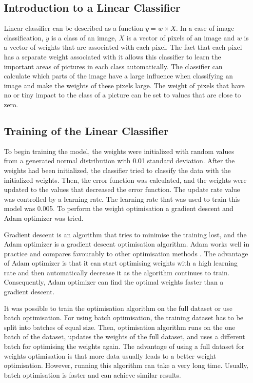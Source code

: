 \subsection{Introduction to a Linear Classifier}
 Linear classifier can be described as a function \(y = w\times X\). In a case of image classification, \(y\) is a class of an image, \(X\) is a vector of pixels of an image and  \(w\) is a vector of weights that are associated with each pixel. The fact that each pixel has a separate weight associated with it allows this classifier to learn the important areas of pictures in each class automatically. The classifier can calculate which parts of the image have a large influence when classifying an image and make the weights of these pixels large. The weight of pixels that have no or tiny impact to the class of a picture can be set to values that are close to zero.

\subsection{Training  of  the Linear Classifier}
To begin training the model, the weights were initialized with random values from a generated normal distribution with 0.01 standard deviation. After the weights had been initialized, the classifier tried to classify the data with the initialized weights. Then, the error function was calculated, and the weights were updated to the values that decreased the error function. The update rate value was controlled by a learning rate. The learning rate that was used to train this model was 0.005. To perform the weight optimisation a gradient descent and Adam optimizer was tried.

Gradient descent is an algorithm that tries to minimise the training lost, and the Adam optimizer is a gradient descent optimisation algorithm. Adam works well in practice and compares favourably to other optimisation methods \citep{adam}. The advantage of Adam optimizer is that it can start optimising weights with a high learning rate and then automatically decrease it as the algorithm continues to train. Consequently, Adam optimizer can find the optimal weights faster than a gradient descent.

It was possible to train the optimisation algorithm on the full dataset or use batch optimisation. For using batch optimisation,  the training dataset has to be split into batches of equal size. Then, optimisation algorithm runs on the one batch of the dataset, updates the weights of the full dataset, and uses a different batch for optimising the weights again. The advantage of using a full dataset for weights optimisation is that more data usually leads to a better weight optimisation. However, running this algorithm can take a very long time. Usually, batch optimisation is faster and can achieve similar results.

